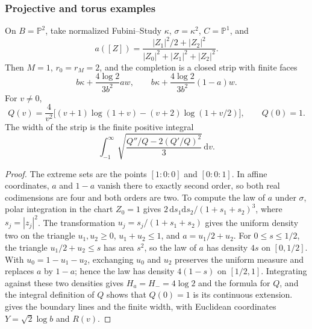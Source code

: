 



\subsubsection{Projective and torus examples}

\begin{example}\label{ex:warped-projective-strip}
On $B=\mathbb P^2$, take normalized Fubini--Study $\kappa$, $\sigma=\kappa^2$, $C=\mathbb P^1$, and
\[
 a([Z])=\frac{|Z_1|^2/2+|Z_2|^2}
                  {|Z_0|^2+|Z_1|^2+|Z_2|^2}.
\]
Then $M=1$, $r_0=r_M=2$, and the completion is a closed strip with finite faces
\[
 b\kappa+\frac{4\log2}{3b^2}a w,\qquad
 b\kappa+\frac{4\log2}{3b^2}(1-a)w.
\]
For $v\ne0$,
\[
 Q(v)=\frac4{v^2}\bigl[(v+1)\log(1+v)
                      -(v+2)\log(1+v/2)\bigr],
 \qquad Q(0)=1.
\]
The width of the strip is the finite positive integral
\[
 \int_{-1}^{\infty}
       \sqrt{\frac{Q''/Q-2(Q'/Q)^2}{3}}\,\mathrm{d}v.
\]
\end{example}
\begin{proof}
The extreme sets are the points $[1:0:0]$ and $[0:0:1]$. In affine coordinates, $a$ and $1-a$ vanish there to exactly second order, so both real codimensions are four and both orders are two. To compute the law of $a$ under $\sigma$, polar integration in the chart $Z_0=1$ gives $2\,\mathrm{d}s_1\mathrm{d}s_2/(1+s_1+s_2)^3$, where $s_j=|z_j|^2$. The transformation $u_j=s_j/(1+s_1+s_2)$ gives the uniform density two on the triangle $u_1,u_2\geq0$, $u_1+u_2\leq1$, and $a=u_1/2+u_2$. For $0\leq s\leq1/2$, the triangle $u_1/2+u_2\leq s$ has area $s^2$, so the law of $a$ has density $4s$ on $[0,1/2]$. With $u_0=1-u_1-u_2$, exchanging $u_0$ and $u_2$ preserves the uniform measure and replaces $a$ by $1-a$; hence the law has density $4(1-s)$ on $[1/2,1]$. Integrating against these two densities gives $H_a=H_-=4\log2$ and the formula for $Q$, and the integral definition of $Q$ shows that $Q(0)=1$ is its continuous extension.  gives the boundary lines and the finite width, with Euclidean coordinates $Y=\sqrt2\log b$ and $R(v)$.
\end{proof}

